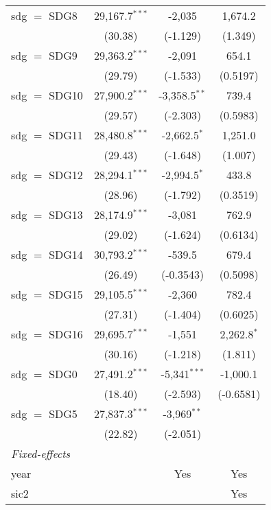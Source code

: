 \begin{tabular}{lccc}
   sdg $=$ SDG8  & 29,167.7$^{***}$ & -2,035           & 1,674.2\\   
                 & (30.38)          & (-1.129)         & (1.349)\\   
   sdg $=$ SDG9  & 29,363.2$^{***}$ & -2,091           & 654.1\\   
                 & (29.79)          & (-1.533)         & (0.5197)\\   
   sdg $=$ SDG10 & 27,900.2$^{***}$ & -3,358.5$^{**}$  & 739.4\\   
                 & (29.57)          & (-2.303)         & (0.5983)\\   
   sdg $=$ SDG11 & 28,480.8$^{***}$ & -2,662.5$^{*}$   & 1,251.0\\   
                 & (29.43)          & (-1.648)         & (1.007)\\   
   sdg $=$ SDG12 & 28,294.1$^{***}$ & -2,994.5$^{*}$   & 433.8\\   
                 & (28.96)          & (-1.792)         & (0.3519)\\   
   sdg $=$ SDG13 & 28,174.9$^{***}$ & -3,081           & 762.9\\   
                 & (29.02)          & (-1.624)         & (0.6134)\\   
   sdg $=$ SDG14 & 30,793.2$^{***}$ & -539.5           & 679.4\\   
                 & (26.49)          & (-0.3543)        & (0.5098)\\   
   sdg $=$ SDG15 & 29,105.5$^{***}$ & -2,360           & 782.4\\   
                 & (27.31)          & (-1.404)         & (0.6025)\\   
   sdg $=$ SDG16 & 29,695.7$^{***}$ & -1,551           & 2,262.8$^{*}$\\   
                 & (30.16)          & (-1.218)         & (1.811)\\   
   sdg $=$ SDG0  & 27,491.2$^{***}$ & -5,341$^{***}$   & -1,000.1\\   
                 & (18.40)          & (-2.593)         & (-0.6581)\\   
   sdg $=$ SDG5  & 27,837.3$^{***}$ & -3,969$^{**}$    &   \\   
                 & (22.82)          & (-2.051)         &   \\   
   \midrule
   \emph{Fixed-effects}\\
   year          &                  & Yes              & Yes\\  
   sic2          &                  &                  & Yes\\  

\end{tabular}
